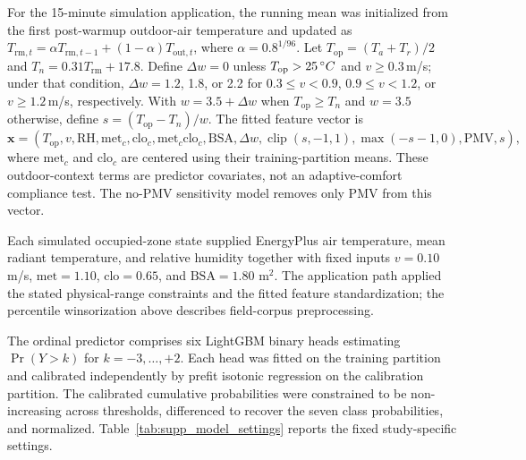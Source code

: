 \documentclass[11pt]{article}
\begin{document}
For the 15-minute simulation application, the running mean was initialized from the first post-warmup outdoor-air temperature and updated as \(T_{\mathrm{rm},t}=\alpha T_{\mathrm{rm},t-1}+(1-\alpha)T_{\mathrm{out},t}\), where \(\alpha=0.8^{1/96}\). Let $T_{\mathrm{op}}=(T_a+T_r)/2$ and $T_n=0.31T_{\mathrm{rm}}+17.8$. Define $\Delta w=0$ unless $T_{\mathrm{op}}>25\,\degree C$ and $v\ge0.3$\,m/s; under that condition, $\Delta w=1.2$, 1.8, or 2.2 for $0.3\le v<0.9$, $0.9\le v<1.2$, or $v\ge1.2$\,m/s, respectively. With $w=3.5+\Delta w$ when $T_{\mathrm{op}}\ge T_n$ and $w=3.5$ otherwise, define $s=(T_{\mathrm{op}}-T_n)/w$. The fitted feature vector is
\begin{equation}
\mathbf{x}=\left(T_{\mathrm{op}},v,\mathrm{RH},\mathrm{met}_c,\mathrm{clo}_c,
\mathrm{met}_c\mathrm{clo}_c,\mathrm{BSA},\Delta w,
\operatorname{clip}(s,-1,1),\max(-s-1,0),\mathrm{PMV},s\right),
\end{equation}
where $\mathrm{met}_c$ and $\mathrm{clo}_c$ are centered using their training-partition means. These outdoor-context terms are predictor covariates, not an adaptive-comfort compliance test. The no-PMV sensitivity model removes only PMV from this vector.

Each simulated occupied-zone state supplied EnergyPlus air temperature, mean radiant temperature, and relative humidity together with fixed inputs \(v=0.10\) m/s, \(\mathrm{met}=1.10\), \(\mathrm{clo}=0.65\), and \(\mathrm{BSA}=1.80\) m$^2$. The application path applied the stated physical-range constraints and the fitted feature standardization; the percentile winsorization above describes field-corpus preprocessing.

The ordinal predictor comprises six LightGBM binary heads estimating $\Pr(Y>k)$ for $k=-3,\ldots,+2$. Each head was fitted on the training partition and calibrated independently by prefit isotonic regression on the calibration partition. The calibrated cumulative probabilities were constrained to be non-increasing across thresholds, differenced to recover the seven class probabilities, and normalized. Table~\ref{tab:supp_model_settings} reports the fixed study-specific settings.
\end{document}
